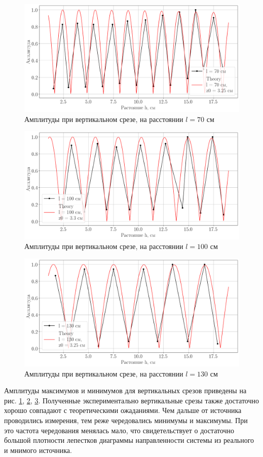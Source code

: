 \begin{figure}[h!]
	\centering
	\includegraphics[width =0.8\linewidth]{fig/task31}
	\caption{Амплитуды при вертикальном срезе, на расстоянии $l=70$ см}
	\label{fig:task31}
\end{figure}

\begin{figure}[h!]
	\centering
	\includegraphics[width =0.8\linewidth]{fig/task32}
	\caption{Амплитуды при вертикальном срезе, на расстоянии $l=100$ см}
	\label{fig:task32}
\end{figure}

\begin{figure}[h!]
	\centering
	\includegraphics[width =0.8\linewidth]{fig/task33}
	\caption{Амплитуды при вертикальном срезе, на расстоянии $l=130$ см}
	\label{fig:task33}
\end{figure}

Амплитуды максимумов и минимумов для вертикальных срезов приведены на рис. \ref{fig:task31}, \ref{fig:task32},
\ref{fig:task33}.
Полученные экспериментально вертикальные срезы также достаточно хорошо совпадают с теоретическими ожаданиями. Чем дальше
от источника проводились измерения, тем реже чередовались минимумы и максимумы. При это частота чередования менялась
мало, что свидетельствует о достаточно большой плотности лепестков диаграммы направленности системы из реального и
мнимого источника.

